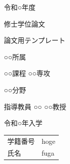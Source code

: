 \documentclass[main]{subfiles}
\begin{document}
\begin{titlepage}
    \fontsize{30pt}{30pt} \selectfont

    \centering
    令和○年度
    \vspace{15pt}

    修士学位論文
    \vspace{45pt}

    論文用テンプレート
    \vspace{45pt}

    ○○所属
    \vspace{20pt}

    ○○課程 ○○専攻
    \vspace{20pt}

    ○○分野
    \vspace{45pt}

    指導教員 ○○ ○○教授
    \vspace{45pt}

    令和○年入学
    \vspace{15pt}

    \begin{tabular}{ll}
        学籍番号 & hoge \\
        氏名   & fuga \\
    \end{tabular}
    \normalsize

\end{titlepage}
\end{document}
